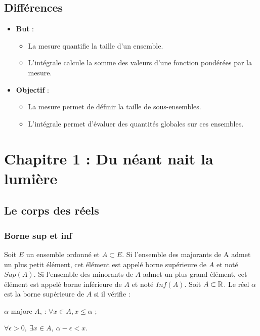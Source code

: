\subsection*{Différences}
\begin{itemize}
    \item \textbf{But} :
        \begin{itemize}
            \item La mesure quantifie la taille d'un ensemble.
            \item L'intégrale calcule la somme des valeurs d'une fonction pondérées par la mesure.
        \end{itemize}
    \item \textbf{Objectif} :
        \begin{itemize}
            \item La mesure permet de définir la taille de sous-ensembles.
            \item L'intégrale permet d'évaluer des quantités globales sur ces ensembles.
        \end{itemize}
\end{itemize}

\newpage

\section{Chapitre 1 : Du néant nait la lumière}
\subsection{Le corps des réels}
\subsubsection{Borne sup et inf}

Soit $E$ un ensemble ordonné et $A \subset E$. Si l'ensemble des majorants de A admet un plus petit élément, cet élément est appelé borne supérieure de $A$ et noté $Sup(A)$. Si l'ensemble des minorants de $A$ admet un plus grand élément, cet élément est appelé borne inférieure de $A$ et noté $Inf(A)$.
\ed
\medskip
{} 
Soit $A \subset \mathbb{R}$. Le réel $\alpha$ est la borne supérieure de $A$ si il vérifie : 
\ben
\item $\alpha$ majore $A$, \ie : $\forall x \in A, x \leq \alpha$ ;
\item $\forall \epsilon > 0, ~ \exists x \in A, ~ \alpha-\epsilon < x$.
\een
\ed
\medskip

